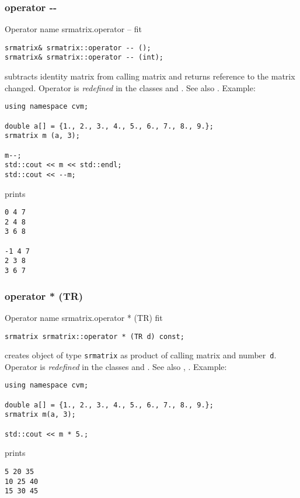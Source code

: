\subsubsection{operator -{}-}
Operator%
\pdfdest name {srmatrix.operator --} fit
\begin{verbatim}
srmatrix& srmatrix::operator -- ();
srmatrix& srmatrix::operator -- (int);
\end{verbatim}
subtracts identity matrix from  calling matrix
and returns reference to
the matrix changed.
Operator is \emph{redefined} in the classes
 and .
See also .
Example:
\begin{Verbatim}
using namespace cvm;

double a[] = {1., 2., 3., 4., 5., 6., 7., 8., 9.};
srmatrix m (a, 3);

m--;
std::cout << m << std::endl;
std::cout << --m;
\end{Verbatim}
prints
\begin{Verbatim}
0 4 7
2 4 8
3 6 8

-1 4 7
2 3 8
3 6 7
\end{Verbatim}
\newpage



\subsubsection{operator * (TR)}
Operator%
\pdfdest name {srmatrix.operator * (TR)} fit
\begin{verbatim}
srmatrix srmatrix::operator * (TR d) const;
\end{verbatim}
creates  object of type \verb"srmatrix" as  product of
 calling matrix and  number~\verb"d".
Operator is \emph{redefined} in the classes
and .
See also ,
.
Example:
\begin{Verbatim}
using namespace cvm;

double a[] = {1., 2., 3., 4., 5., 6., 7., 8., 9.};
srmatrix m(a, 3);

std::cout << m * 5.;
\end{Verbatim}
prints
\begin{Verbatim}
5 20 35
10 25 40
15 30 45
\end{Verbatim}
\newpage



